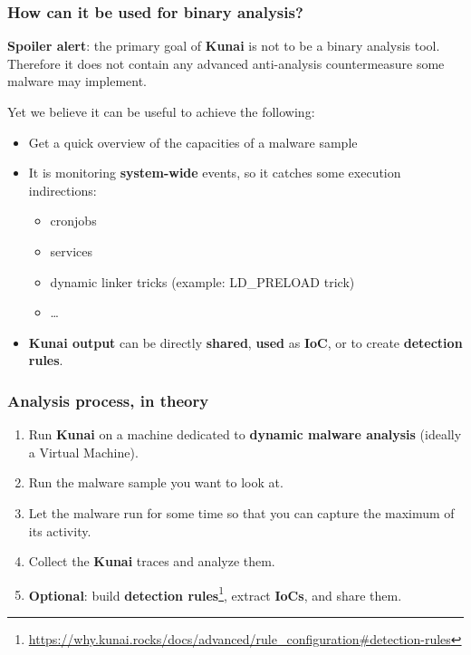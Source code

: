 \begin{frame}
	\frametitle{How can it be used for binary analysis?}

	\textbf{Spoiler alert}: the primary goal of \textbf{Kunai} is not to be a binary analysis tool. Therefore it does not contain any advanced anti-analysis countermeasure some malware may implement.

	\vspace{1em}
	\par
	Yet we believe it can be useful to achieve the following:
	\begin{itemize}
		\item Get a quick overview of the capacities of a malware sample
		\item It is monitoring \textbf{system-wide} events, so it catches some execution indirections:
		      \begin{itemize}
			      \item cronjobs
			      \item services
			      \item dynamic linker tricks (example: LD\_PRELOAD trick)
			      \item \ldots
		      \end{itemize}
		\item \textbf{Kunai output} can be directly \textbf{shared}, \textbf{used} as \textbf{IoC}, or to create \textbf{detection rules}.
	\end{itemize}
\end{frame}

\begin{frame}
	\frametitle{Analysis process, in theory}

	\begin{enumerate}
		\item Run \textbf{Kunai} on a machine dedicated to \textbf{dynamic malware analysis} (ideally a Virtual Machine).
		\item Run the malware sample you want to look at.
		\item Let the malware run for some time so that you can capture the maximum of its activity.
		\item Collect the \textbf{Kunai} traces and analyze them.
		\item \textbf{Optional}: build \textbf{detection rules}\footnote{\url{https://why.kunai.rocks/docs/advanced/rule_configuration#detection-rules}}, extract \textbf{IoCs}, and share them.
	\end{enumerate}
\end{frame}


